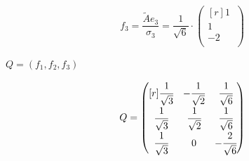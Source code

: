 \documentclass[12pt]{article}
\theoremstyle{definition}
\numberwithin{equation}{section}
\begin{document}
\\
\[f_3=\frac{\tilde{A}e_3}{\sigma_3}=\frac{1}{\sqrt{6}} \cdot \begin{pmatrix}[r]
1~\\         
1~\\
-2~\\
\end{pmatrix}\]
\begin{center} $Q=(f_1, f_2, f_3)$ \end{center}
\[Q = \begin{pmatrix}[r]
\cfrac{1}{\sqrt{3}} & -\cfrac{1}{\sqrt{2}} & \cfrac{1}{\sqrt{6}}\\ \cfrac{1}{\sqrt{3}} & \cfrac{1}{\sqrt{2}} & \cfrac{1}{\sqrt{6}}\\ \cfrac{1}{\sqrt{3}} & 0 & -\cfrac{2}{\sqrt{6}}\\ 
\end{pmatrix}\]
\\
\end{document}
